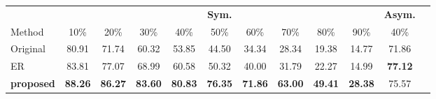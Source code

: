 \documentclass{article}
\begin{document}
\begin{table}[htbp]
\centering
\begin{tabular}{lccccccccccc}
\toprule
\multicolumn{1}{l}{} & \multicolumn{9}{c}{\textbf{Sym.}} & \multicolumn{1}{c}{\textbf{Asym.}} \\
\cmidrule(lr){2-10} \cmidrule(lr){11-11}
Method & 10\% & 20\% & 30\% & 40\% & 50\% & 60\% & 70\% & 80\% & 90\% & 40\% \\
\midrule
Original & 80.91 & 71.74 & 60.32 & 53.85 & 44.50 & 34.34 & 28.34 & 19.38 & 14.77 & 71.86 \\
ER       & 83.81 & 77.07 & 68.99 & 60.58 & 50.32 & 40.00 & 31.79 & 22.27 & 14.99 & \textbf{77.12} \\
\textbf{proposed} & \textbf{88.26} & \textbf{86.27} & \textbf{83.60} & \textbf{80.83} & \textbf{76.35} & \textbf{71.86} & \textbf{63.00} & \textbf{49.41} & \textbf{28.38} & 75.57 \\
\bottomrule
\end{tabular}
\end{table}
\end{document}
